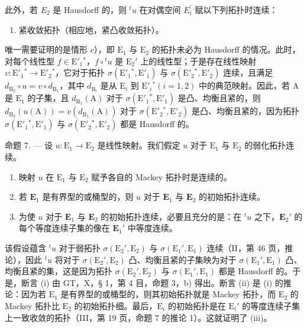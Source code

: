 此外，若 \(E_{2}\) 是 Hausdorff 的，则 \(^{t}u\) 在对偶空间 \(E_{i}^{\prime}\) 赋以下列拓扑时连续：

\begin{enumerate}
\def\labelenumi{\alph{enumi})}
\setcounter{enumi}{4}
\tightlist
\item
  紧收敛拓扑（相应地，紧凸收敛拓扑）。
\end{enumerate}

唯一需要证明的是情形 \(c\)），即 \(\mathrm{E}_1\) 与 \(\mathrm{E}_2\) 的拓扑未必为 Hausdorff 的情况。此时，对每个线性型 \(f \in \mathrm{E}'_1{}^*\)，\(f \circ {}^t u\) 是 \(\mathrm{E}_2'\) 上的线性型；于是存在线性映射 \(v: \mathrm{E}'_1{}^* \to \mathrm{E}'_2{}^*\)，它对于拓扑 \(\sigma(\mathrm{E}'_1{}^*, \mathrm{E}'_1)\) 与 \(\sigma(\mathrm{E}'_2{}^*, \mathrm{E}'_2)\) 连续，且满足 \(d_{\mathrm{B}_2} \circ u = v \circ d_{\mathrm{B}_1}\)，其中 \(d_{\mathrm{B}_i}\) 是从 \(\mathrm{E}_i\) 到 \(\mathrm{E}'_i{}^* (i = 1, 2)\) 中的典范映射。因此，若 A 是 \(\mathrm{E}_1\) 的子集，且 \(d_{\mathrm{B}_1}(\mathrm{A})\) 对于 \(\sigma(\mathrm{E}'_1{}^*, \mathrm{E}'_1)\) 是凸、均衡且紧的，则 \(d_{\mathrm{B}_2}(u(\mathrm{A})) = v(d_{\mathrm{B}_1}(\mathrm{A}))\) 对于 \(\sigma(\mathrm{E}'_2{}^*, \mathrm{E}'_2)\) 是凸、均衡且紧的，因为拓扑 \(\sigma(\mathrm{E}'_1{}^*, \mathrm{E}'_1)\) 与 \(\sigma(\mathrm{E}'_2{}^*, \mathrm{E}'_2)\) 都是 Hausdorff 的。

命题 7. --- 设 \(u: \mathrm{E}_1 \to \mathrm{E}_2\) 是线性映射。我们假定 \(u\) 对于 \(\mathrm{E}_1\) 与 \(\mathrm{E}_2\) 的弱化拓扑连续。

\begin{enumerate}
\def\labelenumi{(\roman{enumi})}
\item
  映射 \(u\) 在 \(\mathrm{E}_1\) 与 \(\mathrm{E}_2\) 赋予各自的 Mackey 拓扑时是连续的。
\item
  若 \(\mathbf{E}_1\) 是有界型的或桶型的，则 \(u\) 对于 \(\mathbf{E}_1\) 与 \(\mathbf{E}_2\) 的初始拓扑连续。
\item
  为使 \(u\) 对于 \(\mathbf{E}_1\) 与 \(\mathbf{E}_2\) 的初始拓扑连续，必要且充分的是：在 \(^t u\) 之下，\(\mathbf{E}_2'\) 的每个等度连续子集的像在 \(\mathbf{E}_1'\) 中等度连续。
\end{enumerate}

该假设蕴含 \({}^t u\) 对于弱拓扑 \(\sigma(\mathrm{E}_2', \mathrm{E}_2)\) 与 \(\sigma(\mathrm{E}_1', \mathrm{E}_1)\) 连续（II，第 46 页，推论），因此 \({}^t u\) 将对于 \(\sigma(\mathrm{E}_2', \mathrm{E}_2)\) 凸、均衡且紧的子集映为对于 \(\sigma(\mathrm{E}_1', \mathrm{E}_1)\) 凸、均衡且紧的集，这是因为拓扑 \(\sigma(\mathrm{E}_2', \mathrm{E}_2)\) 与 \(\sigma(\mathrm{E}_1', \mathrm{E}_1)\) 都是 Hausdorff 的。于是，断言 (i) 由 GT，X，§ 1，第 4 目，命题 3，b) 得出。断言 (ii) 是 (i) 的推论：因为若 \(\mathrm{E}_1\) 是有界型的或桶型的，则其初始拓扑就是 Mackey 拓扑，而 \(\mathrm{E}_2\) 的 Mackey 拓扑比 \(\mathrm{E}_2\) 的初始拓扑细。最后，\(\mathrm{E}_i\) 的初始拓扑是在 \(\mathrm{E}_i'\) 的等度连续子集上一致收敛的拓扑（III，第 19 页，命题 7 的推论 1）。这就证明了 (iii)。

